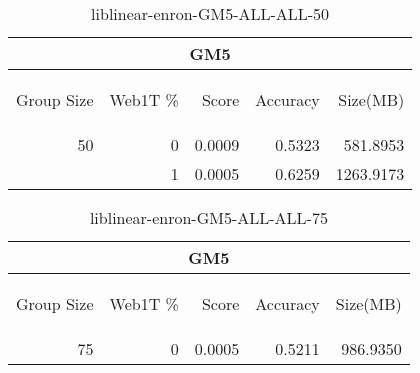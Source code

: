 \begin{center}
\begin{table}[htbp] 
 \begin{center}
\begin{tabular}{ | r | r | r | r | r |}
\hline
\multicolumn{5}{|c|}{GM5}\\
\hline
\begin{sideways}Group Size\end{sideways} & \begin{sideways}Web1T \%\end{sideways} & \begin{sideways}Score\end{sideways} & \begin{sideways}Accuracy\end{sideways} & \begin{sideways}Size(MB)\end{sideways}\\
\hline
\multirow{1}{*}{50}
 & 0 & 0.0009 & 0.5323 & 581.8953\\ \cline{2-5}
 & 1 & 0.0005 & 0.6259 & 1263.9173\\ \cline{2-5}
\hline
\end{tabular}
\caption{liblinear-enron-GM5-ALL-ALL-50}
\label{table:liblinear-enron-GM5-ALL-ALL-50}
\end{center}
 \end{table}
\end{center}

\begin{center}
\begin{table}[htbp] 
 \begin{center}
\begin{tabular}{ | r | r | r | r | r |}
\hline
\multicolumn{5}{|c|}{GM5}\\
\hline
\begin{sideways}Group Size\end{sideways} & \begin{sideways}Web1T \%\end{sideways} & \begin{sideways}Score\end{sideways} & \begin{sideways}Accuracy\end{sideways} & \begin{sideways}Size(MB)\end{sideways}\\
\hline
\multirow{0}{*}{75}
 & 0 & 0.0005 & 0.5211 & 986.9350\\ \cline{2-5}
\hline
\end{tabular}
\caption{liblinear-enron-GM5-ALL-ALL-75}
\label{table:liblinear-enron-GM5-ALL-ALL-75}
\end{center}
 \end{table}
\end{center}

